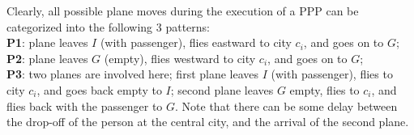 \documentclass{llncs}
\begin{document}
% 
% 
% 
% 
% 
% 
% 


Clearly, all possible plane moves during the execution of a PPP can be categorized into the following 3 patterns: \\
{\bf P1}: plane leaves $I$ (with passenger), flies eastward to city $c_i$, and goes on to $G$;\\
{\bf P2}: plane leaves $G$ (empty), flies westward to city $c_i$, and goes on to $G$;\\
{\bf P3}: two planes are involved here; first plane leaves $I$ (with passenger), flies to city $c_i$, and goes back empty to $I$; second plane leaves $G$ empty, flies to $c_i$, and flies back with the passenger to $G$. Note that there can be some delay between the drop-off of the person at the central city, and the arrival of the second plane.
\end{document}
